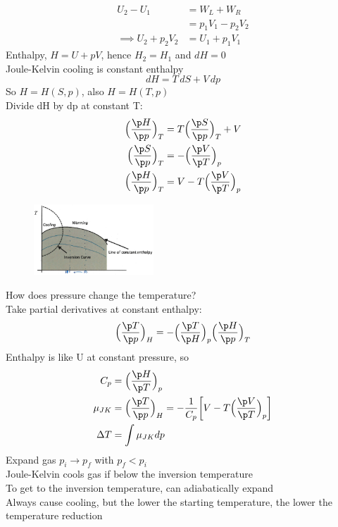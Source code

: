 \documentclass[a4paper, 11pt, normalem]{report}
\begin{document}
\begin{align*}
    U_2 - U_1 &= W_L + W_R \\
    &= p_1 V_1 - p_2 V_2 \\
    \implies U_2 + p_2 V_2 &= U_1 + p_1 V_1
\end{align*}
Enthalpy, $H = U + pV$, hence $H_2 = H_1$ and $dH = 0$ \\
Joule-Kelvin cooling is constant enthalpy
\begin{equation*}
    dH = T\,dS + V\,dp
\end{equation*}
So $H = H(S,p)$, also $H = H(T,p)$ \\
Divide dH by dp at constant T:
\begin{align*}
    \Big(\frac{\p H}{\p p}\Big)_T &= T\Big(\frac{\p S}{\p p}\Big)_T + V \\
    \Big(\frac{\p S}{\p p}\Big)_T &= -\Big(\frac{\p V}{\p T}\Big)_p \\
    \Big(\frac{\p H}{\p p}\Big)_T &= V - T\Big(\frac{\p V}{\p T}\Big)_p
\end{align*}

\begin{figure}
    \begin{center}
        \includegraphics[width=0.4\textwidth]{JouleKelvin2.png}
        \vspace{-50pt}
    \end{center}
\end{figure}

How does pressure change the temperature? \\
Take partial derivatives at constant enthalpy:
\begin{equation*}
    \Big(\frac{\p T}{\p p}\Big)_H = -\Big(\frac{\p T}{\p H}\Big)_p \Big(\frac{\p H}{\p p}\Big)_T
\end{equation*}
Enthalpy is like U at constant pressure, so
\begin{align*}
    C_p &= \Big(\frac{\p H}{\p T}\Big)_p \\
    \mu_{JK} &= \Big(\frac{\p T}{\p p}\Big)_H = -\frac{1}{C_p} \bigg[V - T\Big(\frac{\p V}{\p T}\Big)_p\bigg] \\
    \Delta T &= \int \mu_{JK} dp
\end{align*}
Expand gas $p_i \to p_f$ with $p_f < p_i$ \\
Joule-Kelvin cools gas if below the inversion temperature \\
To get to the inversion temperature, can adiabatically expand \\
Always cause cooling, but the lower the starting temperature, the lower the temperature reduction
\end{document}
